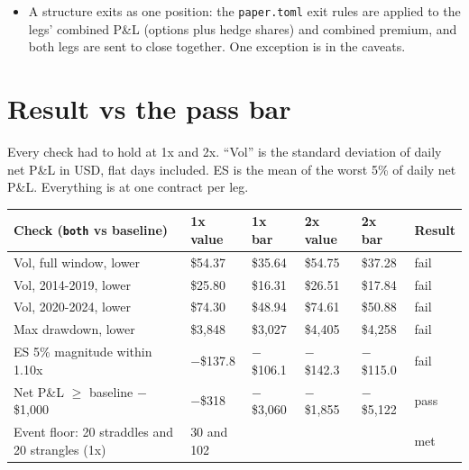 \documentclass{article}
\begin{document}
\begin{itemize}
\begin{itemize}
\item a structure's two legs are charged as one order;

\item each leg fills at its own quoted half-spread.

\end{itemize}

Signals, exits and hedges run once a day at 10:15 ET.

\item A structure exits as one position: the \texttt{paper.\allowbreak{}toml} exit rules are applied to the legs' combined P\&L (options plus hedge shares) and combined premium, and both legs are sent to close together. One exception is in the caveats.

\end{itemize}

\section{Result vs the pass bar}

Every check had to hold at 1x and 2x. ``Vol'' is the standard deviation of daily net P\&L in USD, flat days included. ES is the mean of the worst 5\% of daily net P\&L. Everything is at one contract per leg.

\begin{center}\small
\begin{tabularx}{\linewidth}{>{\raggedright\arraybackslash}X l l l l l}
\toprule
\textbf{Check (\texttt{both} vs baseline)} & \textbf{1x value} & \textbf{1x bar} & \textbf{2x value} & \textbf{2x bar} & \textbf{Result} \\
\midrule
Vol, full window, lower & \$54.37 & \$35.64 & \$54.75 & \$37.28 & fail \\
Vol, 2014-2019, lower & \$25.80 & \$16.31 & \$26.51 & \$17.84 & fail \\
Vol, 2020-2024, lower & \$74.30 & \$48.94 & \$74.61 & \$50.88 & fail \\
Max drawdown, lower & \$3,848 & \$3,027 & \$4,405 & \$4,258 & fail \\
ES 5\% magnitude within 1.10x & \ensuremath{-}\$137.8 & \ensuremath{-}\$106.1 & \ensuremath{-}\$142.3 & \ensuremath{-}\$115.0 & fail \\
Net P\&L \ensuremath{\geq} baseline \ensuremath{-} \$1,000 & \ensuremath{-}\$318 & \ensuremath{-}\$3,060 & \ensuremath{-}\$1,855 & \ensuremath{-}\$5,122 & pass \\
Event floor: 20 straddles and 20 strangles (1x) & 30 and 102 &  &  &  & met \\
\bottomrule
\end{tabularx}
\end{center}
\end{document}
